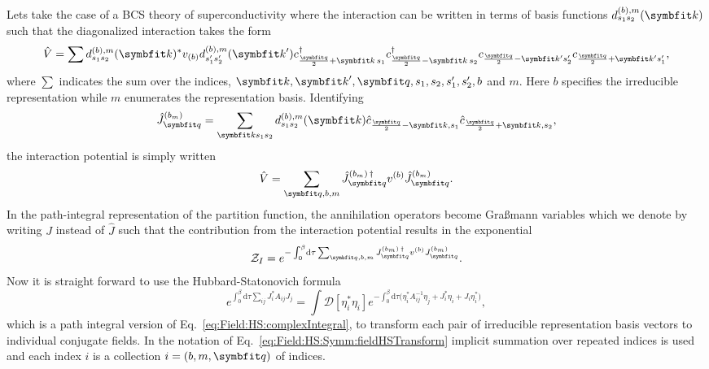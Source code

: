 Lets take the case of a BCS theory of superconductivity where the interaction can be written in terms of
basis functions $d^{(b),m}_{s_1s_2}(\v{k})$ such that the diagonalized interaction takes the form
\begin{equation}
    \label{eq:Field:HS:Symm:diagonalizedV}
    \hat{V} = \sum d^{(b),m}_{s_1s_2}(\v{k})^\ast v_{(b)}d^{(b),m}_{s_1's_2'}(\v{k}') c_{\frac{\v{q}}{2}+\v{k}\,s_1}^\dagger c_{\frac{\v{q}}{2}-\v{k}\,s_2}^\dagger c_{\frac{\v{q}}{2}-\v{k}'s_2'}c_{\frac{\v{q}}{2}+\v{k}'s_1'},
\end{equation}
where $\sum$ indicates the sum over the indices, $\v{k}, \v{k}', \v{q}, s_1, s_2, s_1', s_2', b$ and $m$. Here $b$ specifies the irreducible representation
while $m$ enumerates the representation basis.
Identifying
\begin{equation}
    \label{eq:Field:HS:Symm:identification}
    \hat{J}_\v{q}^{(b_m)} = \sum_{\v{k}s_1s_2}d^{(b),m}_{s_1s_2}(\v{k})\hat{c}_{\frac{\v{q}}{2}-\v{k},s_1}\hat{c}_{\frac{\v{q}}{2}+\v{k},s_2},
\end{equation}
the interaction potential is simply written
\begin{equation}
    \label{eq:Field:HS:Symm:HSpreparedV}
    \hat{V} = \sum_{\v{q},b,m}\hat{J}_\v{q}^{(b_m)\,\dagger}v^{(b)}\hat{J}_\v{q}^{(b_m)}.
\end{equation}
In the path-integral representation of the partition function, the annihilation operators become Gra\ss mann variables which we denote
by writing $J$ instead of $\hat{J}$ such that the contribution from the interaction potential results in the exponential
\begin{equation}
    \label{eq:Field:HS:Symm:potentialExp}
    \mathcal{Z}_I = e^{-\int_0^\beta\!\mathrm{d}\tau\sum_{\v{q},b,m}J_\v{q}^{(b_m)\,\dagger}v^{(b)}J_\v{q}^{(b_m)}}.
\end{equation}
Now it is straight forward to use the Hubbard-Statonovich formula
\begin{equation}
    \label{eq:Field:HS:Symm:fieldHSTransform}
    e^{\int_0^\beta\!\mathrm{d}\tau\sum_{ij} J_i^\ast A_{ij}J_{j}} = \int\!\mathcal{D}[\eta_i^\ast\eta_i]e^{-\int_0^\beta\!\mathrm{d}\tau\big(\eta_i^\ast A^{-1}_{ij}\eta_j + J_i^\ast\eta_i+J_i\eta_i^\ast\big)},
\end{equation}
which is a path integral version of Eq.~\eqref{eq:Field:HS:complexIntegral}, to transform each pair of irreducible representation basis vectors to
individual conjugate fields. In the notation of Eq.~\eqref{eq:Field:HS:Symm:fieldHSTransform} implicit summation over repeated indices is used and each index $i$ is a collection $i = (b,m,\v{q})$ of indices.
